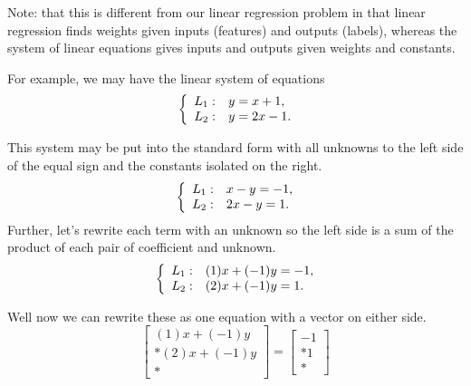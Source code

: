 \documentclass{article}
\begin{document}
Note: that this is different from our linear regression problem in that linear regression finds weights given inputs (features) and outputs (labels),
whereas the system of linear equations gives inputs and outputs given weights and constants.

For example, we may have the linear system of equations
\begin{equation}\label{eq:system 1}
    \left\{
        \begin{array}{ll@{}}
            L_1: & y = x + 1, \\*
            L_2: & y = 2x - 1. \\*
        \end{array}
    \right.
\end{equation}

This system may be put into the standard form with all unknowns to the left side of the equal sign and the constants isolated on the right.
\begin{equation}\label{eq:standard system 1}
    \left\{
        \begin{array}{ll@{}}
            L_1: & x - y = -1, \\*
            L_2: & 2x - y = 1. \\*
        \end{array}
    \right.
\end{equation}
Further, let's rewrite each term with an unknown so the left side is a sum of the product of each pair of coefficient and unknown. 
\begin{equation}\label{eq:standard system 1 with coefs}
    \left\{
        \begin{array}{ll@{}}
            L_1: & (1)x + (-1)y = -1, \\*
            L_2: & (2)x + (-1)y = 1. \\*
        \end{array}
    \right.
\end{equation}

Well now we can rewrite these as one equation with a vector on either side.
\begin{equation}\label{eq:linear system 1 vector}
    \left[
        \begin{matrix}
            (1)x + (-1)y \\*
            (2)x + (-1)y \\*
        \end{matrix}
    \right] = \left[
        \begin{matrix}
            -1 \\*
            1 \\*
        \end{matrix}
    \right]
\end{equation}
\end{document}
